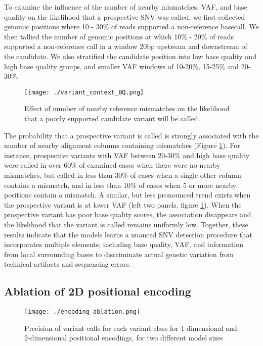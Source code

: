 \documentclass[]{article}
\begin{document}
To examine the influence of the number of nearby mismatches, VAF, and base quality on the likelihood that a prospective SNV was called, we first collected genomic positions where 10 - 30\% of reads supported a non-reference basecall. We then tallied the number of genomic positions at which 10\% - 20\% of reads supported a non-reference call in a window 20bp upstream and downstream of the candidate. We also stratified the candidate position into low base quality and high base quality groups, and smaller VAF windows of 10-20\%, 15-25\% and 20-30\%.  

\begin{figure}[htp]
	\texttt{[image: ./variant\_context\_BQ.png]}
	\caption{ Effect of number of nearby reference mismatches on the likelihood that a poorly supported candidate variant will be called. }
	\label{fig:variant_context}
\end{figure}

The probability that a prospective variant is called is strongly associated with the number of nearby alignment columns containing mismatches (Figure \ref{fig:variant_context}). For instance, prospective variants with VAF between 20-30\% and high base quality were called in over 60\% of examined cases when there were no nearby mismatches, but called in less than 30\% of cases when a single other column contains a mismatch, and in less than 10\% of cases when 5 or more nearby positions contain a mismatch. A similar, but less pronounced trend exists when the prospective variant is at lower VAF (left two panels, figure \ref{fig:variant_context}). When the prospective variant has poor base quality scores, the association disappears and the likelihood that the variant is called remains uniformly low. Together, these results indicate that the models learns a nuanced SNV detection procedure that incorporates multiple elements, including base quality, VAF, and information from local surrounding bases to discriminate actual genetic variation from technical artifacts and sequencing errors.   


\subsection{Ablation of 2D positional encoding}

\begin{figure}[htp]
	\texttt{[image: ./encoding\_ablation.png]}
	\caption{ Precision of variant calls for each variant class for 1-dimensional and 2-dimensional positional encodings, for two different model sizes }
	\label{fig:encoding_ablation}
\end{figure}
\end{document}
